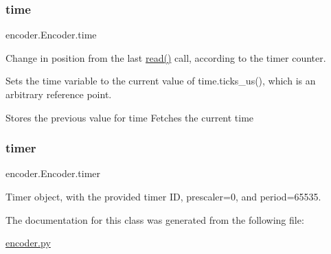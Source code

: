\subsubsection{\texorpdfstring{time}{time}}
{\footnotesize\ttfamily encoder.\+Encoder.\+time}



Change in position from the last \mbox{\hyperlink{classencoder_1_1Encoder_aa1c1535160682500f5214f45d8197027}{read()}} call, according to the timer counter. 

Sets the time variable to the current value of time.\+ticks\+\_\+us(), which is an arbitrary reference point.

Stores the previous value for time Fetches the current time\mbox{\label{classencoder_1_1Encoder_a8e9c3e1317abc4f6fbe95468c69223d1}} 
\subsubsection{\texorpdfstring{timer}{timer}}
{\footnotesize\ttfamily encoder.\+Encoder.\+timer}



Timer object, with the provided timer ID, prescaler=0, and period=65535. 



The documentation for this class was generated from the following file\+:\begin{DoxyCompactItemize}
\item 
\mbox{\hyperlink{encoder_8py}{encoder.\+py}}\end{DoxyCompactItemize}
